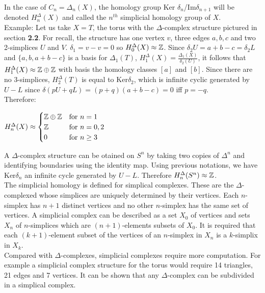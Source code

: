 \documentclass[12pt]{article}
\begin{document}
In the case of $C_n = \Delta_n(X)$, the homology group Ker $\delta_n$/Im$\delta_{n+1}$ will be denoted $H^\Delta_n(X)$ and called the $n^{th}$ simplicial homology group of $X$. \\

Example: Let us take $X = T$, the torus with the $\Delta$-complex structure pictured in section \textbf{2.2}. For recall, the structure has one vertex $v$, three edges $a, b, c$ and two 2-simplices $U$ and $V$. $\delta_1 = v - v = 0$ so $H_0^\Delta(X) \approx \mathbb{Z}$. Since $\delta_2 U = a + b - c = \delta_2 L$ and $\{a, b, a+ b - c\}$ is a basis for $\Delta_1(T)$, $H_1^\Delta(X) = \frac{\Delta_1(X)}{\delta_2(U)}$, it follows that $H_1^\Delta(X) \approx \mathbb{Z} \oplus \mathbb{Z}$ with basis the homology classes $[a]$ and $[b]$. Since there are no 3-simplices, $H_2^\Delta(T)$ is equal to Ker$\delta_2$, which is infinite cyclic generated by $U-L$ since $\delta(pU+qL) = (p+q)(a+b-c) = 0$ iff $p = -q$.\\
Therefore:\\
\begin{center}
  $H_n^\Delta(X) \approx
  \begin{cases}
    \mathbb{Z} \oplus \mathbb{Z} &\text{for $n=1$}\\
    \mathbb{Z} &\text{for $n=0,2$}\\
    0 &\text{for $n\ge3$}
  \end{cases}$
\end{center}

A $\Delta$-complex structure can be otained on $S^n$ by taking two copies of $\Delta^n$ and identifying boundaries using the identity map. Using previous notations, we have Ker$\delta_n$ an infinite cycle generated by $U-L$. Therefore $H_n^\Delta(S^n) \approx \mathbb{Z}$.\\

The simplicial homology is defined for simplical complexes. These are the $\Delta$-complexed whose simplices are uniquely determined by their vertices. Each $n$-simplex has $n+1$ distinct vertices and no other $n$-simplex has the same set of vertices. A simplicial complex can be described as a set $X_0$ of vertices and sets $X_n$ of $n$-simplices which are $(n+1)$-elements subsets of $X_0$. It is required that each $(k+1)$-element subset of the vertices of an $n$-simplex in $X_n$ is a $k$-simplix in $X_k$.\\

Compared with $\Delta$-complexes, simplicial complexes require more computation. For example a simplicial complex structure for the torus would require 14 triangles, 21 edges and 7 vertices. It can be shown that any $\Delta$-complex can be subdivided in a simplical complex.\\
\end{document}
